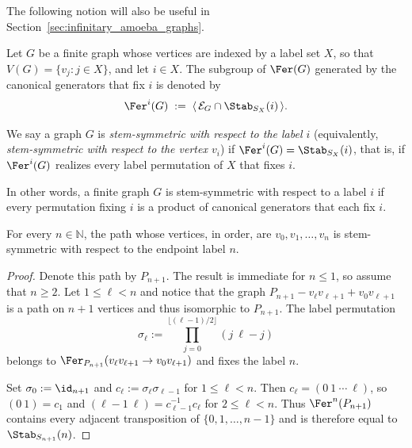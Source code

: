 The following notion will also be useful in Section~\ref{sec:infinitary_amoeba_graphs}.

\begin{definition}\label{def:stem-symmetric}
    Let $G$ be a finite graph whose vertices are indexed by a label set $X$, so that $V(G)=\{v_j:j\in X\}$, and let $i\in X$.
    The subgroup of $\Fer(G)$ generated by the canonical generators that fix $i$ is denoted by
    $$
        \Fer^i(G)\;:=\;\langle\,\mathcal E_G\cap\Stab_{S_X}(i)\,\rangle.
    $$

    We say a graph $G$ is \emph{stem-symmetric with respect to the label $i$} (equivalently, \emph{stem-symmetric with respect to the vertex $v_i$}) if $\Fer^i(G)=\Stab_{S_X}(i)$, that is, if $\Fer^i(G)$ realizes every label permutation of $X$ that fixes $i$.
\end{definition}

In other words, a finite graph $G$ is stem-symmetric with respect to a label $i$ if every permutation fixing $i$ is a product of canonical generators that each fix $i$.

\begin{lemma}\label{lemma:path-stem-symmetric}
    For every $n\in\mathbb N$, the path whose vertices, in order, are $v_0,v_1,\dots,v_n$ is stem-symmetric with respect to the endpoint label $n$.
\end{lemma}

\begin{proof}
    Denote this path by $P_{n+1}$.
    The result is immediate for $n\leq1$, so assume that $n\geq2$.
    Let $1\leq\ell<n$ and notice that the graph $P_{n+1}-v_\ell v_{\ell+1}+v_0v_{\ell+1}$ is a path on $n+1$ vertices and thus isomorphic to $P_{n+1}$.
    The label permutation
    $$
        \sigma_\ell:=\prod_{j=0}^{\lfloor(\ell-1)/2\rfloor}(j\ \ell-j)
    $$
    belongs to $\Fer_{P_{n+1}}(v_\ell v_{\ell+1}\to v_0v_{\ell+1})$ and fixes the label $n$.

    Set $\sigma_0:=\id_{n+1}$ and $c_\ell:=\sigma_\ell\sigma_{\ell-1}$ for $1\leq\ell<n$.
    Then $c_\ell=(0\ 1\ \cdots\ \ell)$, so $(0\ 1)=c_1$ and $(\ell-1\ \ell)=c_{\ell-1}^{-1}c_\ell$ for $2\leq\ell<n$.
    Thus $\Fer^n(P_{n+1})$ contains every adjacent transposition of $\{0,1,\dots,n-1\}$ and is therefore equal to $\Stab_{S_{n+1}}(n)$.
\end{proof}
